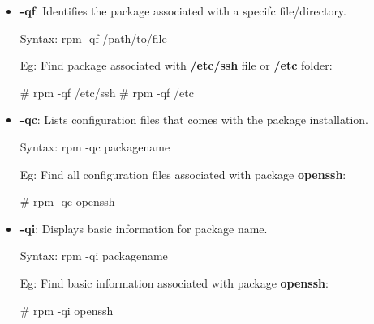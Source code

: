 \begin{flushleft}
\begin{itemize}
		
		\bigskip
		\bigskip
		\item \textbf{-qf}: Identifies the package associated with a specifc file/directory.
		\bigskip
		\begin{tcolorbox}[breakable,notitle,boxrule=-0pt,colback=pink,colframe=pink]
			\color{black}
			\font=9pt
			Syntax: rpm -qf /path/to/file
			\font=4pt
		\end{tcolorbox}
		Eg: Find package associated with \textbf{/etc/ssh} file or \textbf{/etc} folder:
		\bigskip
		\begin{tcolorbox}[breakable,notitle,boxrule=-0pt,colback=black,colframe=black]
			\color{white}
			\font=9pt
			\color{green}
			\# rpm -qf /etc/ssh
			\newline
			\# rpm -qf /etc
			\font=4pt
		\end{tcolorbox}
		

		\bigskip
		\bigskip
		\item \textbf{-qc}: Lists configuration files that comes with the package installation.
		\bigskip
		\begin{tcolorbox}[breakable,notitle,boxrule=-0pt,colback=pink,colframe=pink]
			\color{black}
			\font=9pt
			Syntax: rpm -qc packagename
			\font=4pt
		\end{tcolorbox}
		Eg: Find all configuration files associated with package \textbf{openssh}:
		\bigskip
		\begin{tcolorbox}[breakable,notitle,boxrule=-0pt,colback=black,colframe=black]
			\color{white}
			\font=9pt
			\color{green}
			\# rpm -qc openssh
			\font=4pt
		\end{tcolorbox}

		\bigskip
		\bigskip
		\item \textbf{-qi}: Displays basic information for package name.
		\bigskip
		\begin{tcolorbox}[breakable,notitle,boxrule=-0pt,colback=pink,colframe=pink]
			\color{black}
			\font=9pt
			Syntax: rpm -qi packagename
			\font=4pt
		\end{tcolorbox}
		Eg: Find basic information associated with package \textbf{openssh}:
		\bigskip
		\begin{tcolorbox}[breakable,notitle,boxrule=-0pt,colback=black,colframe=black]
			\color{white}
			\font=9pt
			\color{green}
			\# rpm -qi openssh
			\font=4pt
		\end{tcolorbox}


\end{itemize}
\end{flushleft}
